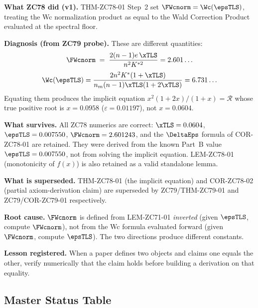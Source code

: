 \documentclass[12pt, a4paper]{article}
\begin{document}
\begin{openqbox}[title={PM-ZC78-02: Substitution Error in THM-ZC78-01
  --- Retroactive Scar (pattern: probe malformed)}]

\textbf{What ZC78 did (v1).}
THM-ZC78-01 Step~2 set $\FWcnorm = \Wc(\epsTLS)$, treating the
Wc normalization product as equal to the Wald Correction Product
evaluated at the spectral floor.

\textbf{Diagnosis (from ZC79 probe).}
These are different quantities:
\[
  \FWcnorm \;=\; \frac{2(n-1)e\,\xTLS}{n^2K^{*2}} = 2.601\ldots
\]
\[
  \Wc(\epsTLS) = \frac{2n^2K^*(1+\xTLS)}{n_m(n-1)\xTLS(1+2\xTLS)} = 6.731\ldots
\]
Equating them produces the implicit equation $x^2(1+2x)/(1+x) = \mathcal{R}$
whose true positive root is $x = 0.0958$ ($\varepsilon = 0.01197$),
not $x = 0.0604$.

\textbf{What survives.}
All ZC78 numerics are correct:
$\xTLS = 0.0604$, $\epsTLS = 0.007550$, $\FWcnorm = 2.601243$,
and the $\DeltaEps$ formula of COR-ZC78-01 are retained.
They were derived from the known Part~B value $\epsTLS = 0.007550$,
not from solving the implicit equation.
LEM-ZC78-01 (monotonicity of $f(x)$) is also retained as a
valid standalone lemma.

\textbf{What is superseded.}
THM-ZC78-01 (the implicit equation) and COR-ZC78-02 (partial
axiom-derivation claim) are superseded by ZC79/THM-ZC79-01
and ZC79/COR-ZC79-01 respectively.

\textbf{Root cause.}
$\FWcnorm$ is defined from LEM-ZC71-01 \emph{inverted}
(given $\epsTLS$, compute $\FWcnorm$), not from the Wc formula
evaluated forward (given $\FWcnorm$, compute $\epsTLS$).
The two directions produce different constants.

\textbf{Lesson registered.}
When a paper defines two objects and claims one equals the other,
verify numerically that the claim holds before building a derivation
on that equality.
\end{openqbox}

\subsection{Master Status Table}
\label{sec:status}
\end{document}
